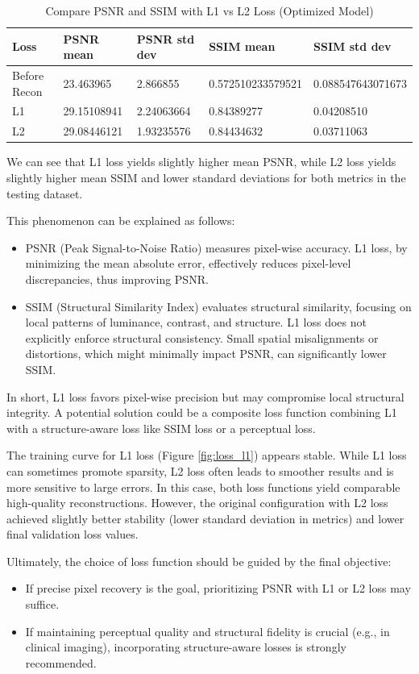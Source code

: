 \documentclass{article}
\begin{document}
\begin{table}[H]
  \caption{Compare PSNR and SSIM with L1 vs L2 Loss (Optimized Model)}
  \label{tab:loss_compare}
  \centering
  \begin{tabular}{lllll}
    \toprule
    Loss & PSNR mean   & PSNR std dev & SSIM mean  & SSIM std dev \\
    \midrule
    Before Recon    & 23.463965 & 2.866855 & 0.572510233579521 & 0.088547643071673 \\
    L1   & 29.15108941 & 2.24063664   & 0.84389277 & 0.04208510   \\
    L2   & 29.08446121 & 1.93235576   & 0.84434632 & 0.03711063   \\
    \bottomrule
  \end{tabular}
\end{table}

We can see that L1 loss yields slightly higher mean PSNR, while L2 loss yields slightly higher mean SSIM and lower standard deviations for both metrics in the testing dataset.

This phenomenon can be explained as follows:
\begin{itemize}
  \item PSNR (Peak Signal-to-Noise Ratio) measures pixel-wise accuracy. L1 loss, by minimizing the mean absolute error, effectively reduces pixel-level discrepancies, thus improving PSNR.
  \item SSIM (Structural Similarity Index) evaluates structural similarity, focusing on local patterns of luminance, contrast, and structure. L1 loss does not explicitly enforce structural consistency. Small spatial misalignments or distortions, which might minimally impact PSNR, can significantly lower SSIM.
\end{itemize}
In short, L1 loss favors pixel-wise precision but may compromise local structural integrity. A potential solution could be a composite loss function combining L1 with a structure-aware loss like SSIM loss or a perceptual loss.

The training curve for L1 loss (Figure \ref{fig:loss_l1}) appears stable. While L1 loss can sometimes promote sparsity, L2 loss often leads to smoother results and is more sensitive to large errors. In this case, both loss functions yield comparable high-quality reconstructions. However, the original configuration with L2 loss achieved slightly better stability (lower standard deviation in metrics) and lower final validation loss values.

Ultimately, the choice of loss function should be guided by the final objective:
\begin{itemize}
  \item If precise pixel recovery is the goal, prioritizing PSNR with L1 or L2 loss may suffice.
  \item If maintaining perceptual quality and structural fidelity is crucial (e.g., in clinical imaging), incorporating structure-aware losses is strongly recommended.
\end{itemize}
\end{document}

